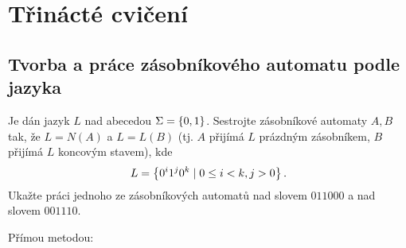 \setlength{\abovedisplayskip}{0pt}
\setlength{\belowdisplayskip}{0pt}
\setlength{\abovedisplayshortskip}{0pt}
\setlength{\belowdisplayshortskip}{0pt}

\section{Třinácté cvičení}

\subsection{Tvorba a práce zásobníkového automatu podle jazyka}
Je dán jazyk $L$ nad abecedou $\Sigma = \left\lbrace 0,1 \right\rbrace$. Sestrojte zásobníkové automaty $A,B$ tak, že $L = N(A)$ a $L = L(B)$
(tj. $A$ přijímá $L$ prázdným zásobníkem, $B$ přijímá $L$ koncovým stavem), kde
\[L = \left\lbrace 0^i 1^j 0^k \mid 0 \leq i < k, j > 0 \right\rbrace\text{.}\]
Ukažte práci jednoho ze zásobníkových automatů nad slovem $011000$ a nad slovem $001110$.

Přímou metodou:

